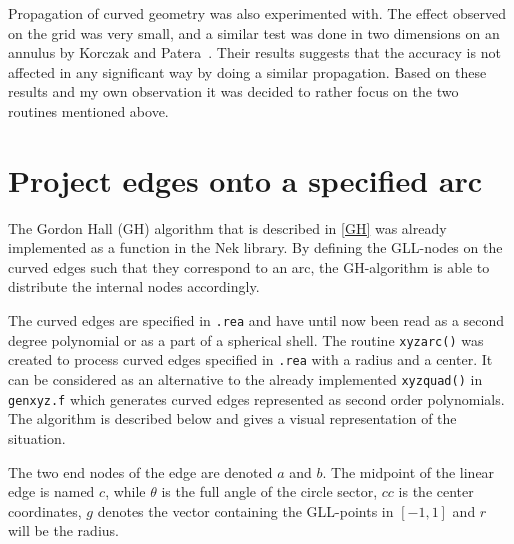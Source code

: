 Propagation of curved geometry was also experimented with. 
The effect observed on the grid was very small, and a similar test was 
done in two dimensions on an annulus by Korczak and Patera~\cite{Patera1986}. 
Their results suggests that the accuracy is not affected in any significant way 
by doing a similar propagation. Based on these results and my own observation 
it was decided to rather focus on the two routines mentioned above.




\section{Project edges onto a specified arc} \label{xyzarc}

The Gordon Hall (GH) algorithm that is described in \cref{GH} was already implemented as a function in the Nek library.
By defining the GLL-nodes on the curved edges such that they correspond to an arc, the GH-algorithm is able to distribute 
the internal nodes accordingly. 

The curved edges are specified in \verb|.rea| and have until now been read as a second degree polynomial or as a part of a 
spherical shell. The routine \verb|xyzarc()| was created to process curved edges specified in \verb|.rea| with a radius and a center.
It can be considered as an alternative to the already implemented \verb|xyzquad()| in \verb|genxyz.f| which generates curved edges 
represented as second order polynomials.
The algorithm is described below and  gives a visual representation of the situation.

The two end nodes of the edge are denoted $a$ and $b$. 
The midpoint of the linear edge is named $c$, while 
$\theta$ is the full angle of the circle sector,
$cc$ is the center coordinates, 
$g$ denotes the vector containing the GLL-points in $[-1,1]$ 
and $r$ will be the radius.

